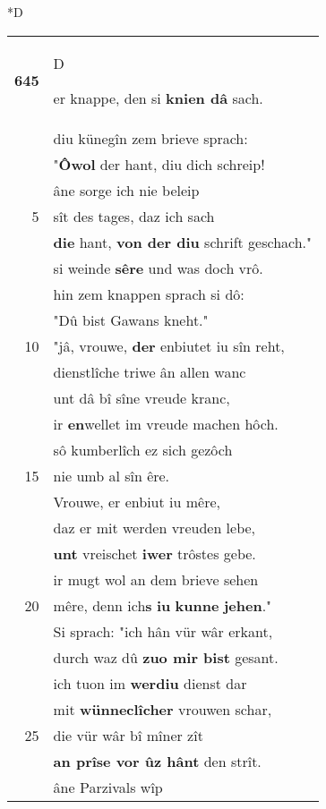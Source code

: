 \documentclass[8pt,a4paper,notitlepage]{article}
\begin{document}
\begin{table}[ht]
\begin{minipage}[t]{0.5\linewidth}
\small
\begin{center}*D
\end{center}
\begin{tabular}{rl}
\textbf{645} & \begin{large}D\end{large}er knappe, den si \textbf{knien dâ} sach.\\ 
 & diu künegîn zem brieve sprach:\\ 
 & "\textbf{Ôwol} der hant, diu dich schreip!\\ 
 & âne sorge ich nie beleip\\ 
5 & sît des tages, daz ich sach\\ 
 & \textbf{die} hant, \textbf{von der diu} schrift geschach."\\ 
 & si weinde \textbf{sêre} und was doch vrô.\\ 
 & hin zem knappen sprach si dô:\\ 
 & "Dû bist Gawans kneht."\\ 
10 & "jâ, vrouwe, \textbf{der} enbiutet iu sîn reht,\\ 
 & dienstlîche triwe ân allen wanc\\ 
 & unt dâ bî sîne vreude kranc,\\ 
 & ir \textbf{en}wellet im vreude machen hôch.\\ 
 & sô kumberlîch ez sich gezôch\\ 
15 & nie umb al sîn êre.\\ 
 & Vrouwe, er enbiut iu mêre,\\ 
 & daz er mit werden vreuden lebe,\\ 
 & \textbf{unt} vreischet \textbf{iwer} trôstes gebe.\\ 
 & ir mugt wol an dem brieve sehen\\ 
20 & mêre, denn ich\textbf{s} \textbf{iu} \textbf{kunne} \textbf{jehen}."\\ 
 & Si sprach: "ich hân vür wâr erkant,\\ 
 & durch waz dû \textbf{zuo mir bist} gesant.\\ 
 & ich tuon im \textbf{werdiu} dienst dar\\ 
 & mit \textbf{wünneclîcher} vrouwen schar,\\ 
25 & die vür wâr bî mîner zît\\ 
 & \textbf{an prîse vor ûz hânt} den strît.\\ 
 & âne Parzivals wîp\\ 

\end{tabular}
\end{minipage}
\end{table}
\end{document}
